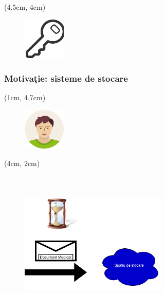 \documentclass{beamer}
\theoremstyle{definition}
\begin{document}
\begin{frame}
{        \begin{textblock*}{4cm}(4.5cm, 4cm)
        \begin{figure}
            \includegraphics[width=2cm,height=2cm,keepaspectratio]{img/motivation/key-128.png}
        \end{figure}
        \end{textblock*}
    }
\end{frame}

\begin{frame}
    \frametitle{Motiva\c{t}ie: sisteme de stocare} 
     {

        \begin{textblock*}{2cm}(1cm, 4.7cm)
        \begin{figure}
            \includegraphics[width=2cm,height=2cm,keepaspectratio]{img/motivation/boy-128.png}
        \end{figure}
        \end{textblock*}
    }
     {

        \begin{textblock*}{4cm}(4cm, 2cm)
        \begin{figure}
            \includegraphics[width=7cm,height=7cm,keepaspectratio]{img/motivation/storage-system.png}
        \end{figure}
        \end{textblock*}
    }
     {

}
\end{frame}
\end{document}

